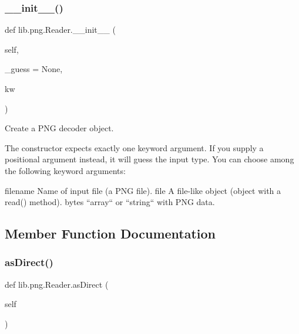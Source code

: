 \subsubsection{\texorpdfstring{\+\_\+\+\_\+init\+\_\+\+\_\+()}{\_\_init\_\_()}}
{\footnotesize\ttfamily def lib.\+png.\+Reader.\+\_\+\+\_\+init\+\_\+\+\_\+ (\begin{DoxyParamCaption}\item[{}]{self,  }\item[{}]{\+\_\+guess = {\ttfamily None},  }\item[{}]{kw }\end{DoxyParamCaption})}

\begin{DoxyVerb}Create a PNG decoder object.

The constructor expects exactly one keyword argument. If you
supply a positional argument instead, it will guess the input
type. You can choose among the following keyword arguments:

filename
  Name of input file (a PNG file).
file
  A file-like object (object with a read() method).
bytes
  ``array`` or ``string`` with PNG data.\end{DoxyVerb}
 

\subsection{Member Function Documentation}
\mbox{\label{classlib_1_1png_1_1_reader_adf97dda070dc0410c95f3873c30200a6}} 
\subsubsection{\texorpdfstring{as\+Direct()}{asDirect()}}
{\footnotesize\ttfamily def lib.\+png.\+Reader.\+as\+Direct (\begin{DoxyParamCaption}\item[{}]{self }\end{DoxyParamCaption})}

